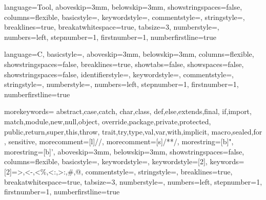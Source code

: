 



{ %
  language=Tool,
  aboveskip=3mm,
  belowskip=3mm,
  showstringspaces=false,
  columns=flexible,
  basicstyle={\footnotesize\ttfamily},
  keywordstyle=\color{blue},
  commentstyle=\color{dkgreen},
  stringstyle=\color{gold},
  breaklines=true,
  breakatwhitespace=true,
  tabsize=3,
  numberstyle=\tiny\color{gray},
  numbers=left,
  stepnumber=1,
  firstnumber=1,
  numberfirstline=true
}

{ %
  language=C,
  basicstyle=\footnotesize\ttfamily,
  aboveskip=3mm,
  belowskip=3mm,
  columns=flexible,
  showstringspaces=false,
  breaklines=true,
  showtabs=false,
  showspaces=false,
  showstringspaces=false,
  identifierstyle=\ttfamily,
  keywordstyle=\color[rgb]{0,0,1},
  commentstyle=\color{dkgreen},
  stringstyle=\color[rgb]{0.627,0.126,0.941},
  numberstyle=\tiny\color{gray},
  numbers=left,
  stepnumber=1,
  firstnumber=1,
  numberfirstline=true
}

{ %
  morekeywords={ abstract,case,catch,
    char,class,
    def,else,extends,final,
    if,import,
    match,module,new,null,object,
    override,package,private,protected,
    public,return,super,this,throw,
    trait,try,type,val,var,with,implicit,
    macro,sealed,for
  },
  sensitive,
  morecomment=[l]//,
  morecomment=[s]{/*}{*/},
  morestring=[b]",
  morestring=[b]',
  aboveskip=3mm,
  belowskip=3mm,
  showstringspaces=false,
  columns=flexible,
  basicstyle={\footnotesize\ttfamily},
  keywordstyle=\color{purple},
  keywordstyle=[2]\color{dkblue},
  keywords=[2]{=>,<-,<\%,<:,>:,\#,@},
  commentstyle=\color{dkgreen},
  stringstyle=\color{gold},
  breaklines=true,
  breakatwhitespace=true,
  tabsize=3,
  numberstyle={\tiny\color{gray}},
  numbers=left,
  stepnumber=1,
  firstnumber=1,
  numberfirstline=true
}




